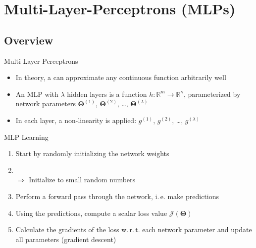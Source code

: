 \section{Multi-Layer-Perceptrons (MLPs)}


\subsection{Overview}

\begin{frame}{Multi-Layer Perceptrons}{}
	\begin{itemize}
		\item In theory, a  can approximate any continuous function arbitrarily well
		\item An MLP with $\lambda$ hidden layers is a function $h: \mathbb{R}^m \rightarrow \mathbb{R}^{\kappa}$,
			parameterized by network parameters $\bm{\Theta}^{(1)}$, $\bm{\Theta}^{(2)}$, \dots, $\bm{\Theta}^{(\lambda)}$
		\item In each layer, a non-linearity is applied: $g^{(1)}$, $g^{(2)}$, \dots, $g^{(\lambda)}$
	\end{itemize}
\end{frame}


\begin{frame}{MLP Learning}{}
	\begin{enumerate}
		\item Start by randomly initializing the network weights
		\item {} \\
			$\Rightarrow$ Initialize to small random numbers
		\item Perform a forward pass through the network, i.\,e. make predictions
		\item Using the predictions, compute a scalar loss value $\mathcal{J}(\bm{\Theta})$
		\item Calculate the gradients of the loss w.\,r.\,t. each network parameter and update all parameters (gradient descent)
	\end{enumerate}
\end{frame}


